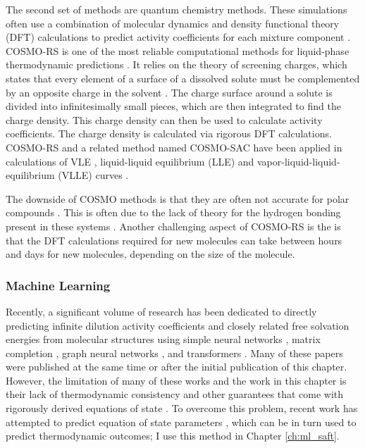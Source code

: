 The second set of methods are quantum chemistry methods. These simulations often use a combination of molecular dynamics and density functional theory (DFT) calculations to predict activity coefficients for each mixture component \cite{Constantinescu2005}. COSMO-RS is one of the most reliable computational methods for liquid-phase thermodynamic predictions \cite{Klamt1995, Klamt2010}. It relies on the theory of screening charges, which states that every element of a surface of a dissolved solute must be complemented by an opposite charge in the solvent  \cite{Klamt1995}. The charge surface around a solute is divided into infinitesimally small pieces, which are then integrated to find the charge density. This charge density can then be used to calculate activity coefficients. The charge density is calculated via rigorous DFT calculations. COSMO-RS and a related method named COSMO-SAC have been applied in calculations of VLE \cite{Constantinescu2005}, liquid-liquid equilibrium (LLE) \cite{Dechambre2014} and vapor-liquid-liquid-equilibrium (VLLE) curves \cite{Kundu2011}.

The downside of COSMO methods is that they are often not accurate for polar compounds \cite{Constantinescu2005, Kundu2011}. This is often due to the lack of theory for the hydrogen bonding present in these systems \cite{Kundu2011}. Another challenging aspect of COSMO-RS is the is that the DFT calculations required for new molecules can take between hours and days for new molecules, depending on the size of the molecule.

\subsubsection{Machine Learning}

Recently, a significant volume of research has been dedicated to directly predicting infinite dilution activity coefficients and closely related free solvation energies from molecular structures using simple neural networks \cite{Urata2002, RamirezBeltran2009, Nami2011, Behrooz2017}, matrix completion \cite{Jirasek2020}, graph neural networks \cite{Grambow_2019, Vermeire2021, Chung2022, SanchezMedina2023a, Qin2023, Rittig2023, SanchezMedina2023b}, and transformers \cite{Winter2022, Winter2023}. Many of these papers were published at the same time or after the initial publication of this chapter. However, the limitation of many of these works and the work in this chapter is their lack of thermodynamic consistency and other guarantees that come with rigorously derived equations of state \cite{Rittig2023b}. To overcome this problem, recent work has attempted to predict equation of state parameters \cite{Abbasi2020, Madani2021, Abdallahelhadj2022, Winter2023, SanchezMedina2023b}, which can be in turn used to predict thermodynamic outcomes; I use this method in Chapter \ref{ch:ml_saft}.

